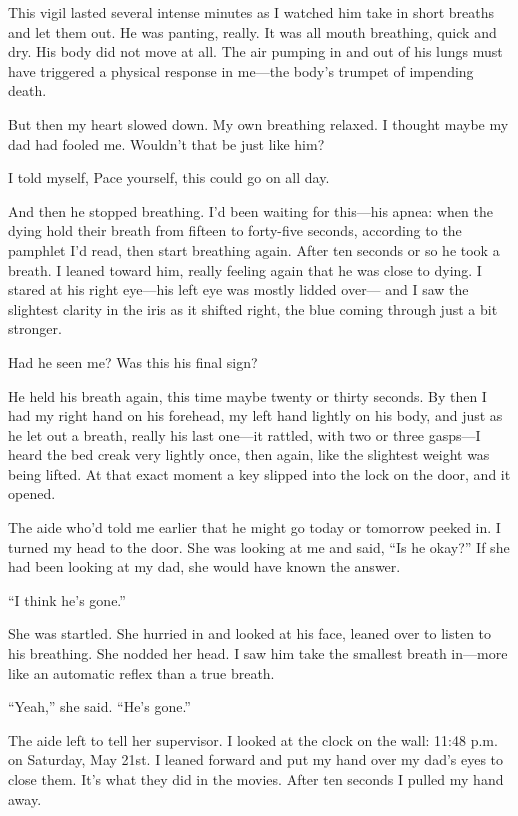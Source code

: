 \documentclass[12pt]{book}
\begin{document}
This vigil lasted several intense minutes as I watched him take in short breaths and let them out. He was panting, really. It was all mouth breathing, quick and dry. His body did not move at all. The air pumping in and out of his lungs must have triggered a physical response in me---the body's trumpet of impending death.

But then my heart slowed down. My own breathing relaxed. I thought maybe my dad had fooled me. Wouldn't that be just like him?

I told myself, Pace yourself, this could go on all day.

And then he stopped breathing. I'd been waiting for this---his apnea: when the dying hold their breath from fifteen to forty-five seconds, according to the pamphlet I'd read, then start breathing again. After ten seconds or so he took a breath. I leaned toward him, really feeling again that he was close to dying. I stared at his right eye---his left eye was mostly lidded over--- and I saw the slightest clarity in the iris as it shifted right, the blue coming through just a bit stronger.

Had he seen me? Was this his final sign?

He held his breath again, this time maybe twenty or thirty seconds. By then I had my right hand on his forehead, my left hand lightly on his body, and just as he let out a breath, really his last one---it rattled, with two or three gasps---I heard the bed creak very lightly once, then again, like the slightest weight was being lifted. At that exact moment a key slipped into the lock on the door, and it opened.

The aide who'd told me earlier that he might go today or tomorrow peeked in. I turned my head to the door. She was looking at me and said, ``Is he okay?'' If she had been looking at my dad, she would have known the answer.

``I think he's gone.''

She was startled. She hurried in and looked at his face, leaned over to listen to his breathing. She nodded her head. I saw him take the smallest breath in---more like an automatic reflex than a true breath.

``Yeah,'' she said. ``He's gone.''

The aide left to tell her supervisor. I looked at the clock on the wall: 11:48 p.m. on Saturday, May 21st. I leaned forward and put my hand over my dad's eyes to close them. It's what they did in the movies. After ten seconds I pulled my hand away.
\end{document}
